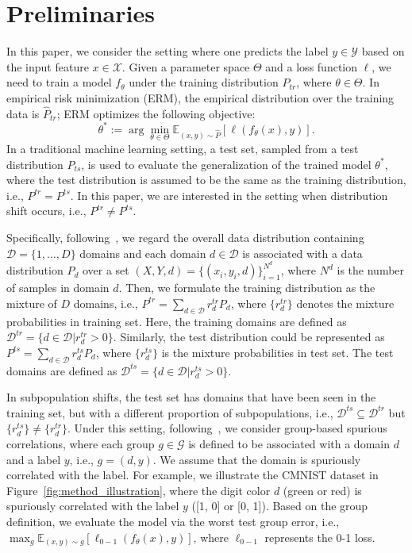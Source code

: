 \section{Preliminaries}
\label{sec:prelim}
In this paper, we consider the setting where one predicts the label $y \in \mathcal{Y}$ based on the input feature $x\in \mathcal{X}$. Given a parameter space $\Theta$ and a loss function $\ell$, we need to train a model $f_{\theta}$ under the training distribution $P_{tr}$, where $\theta \in \Theta$. In empirical risk minimization (ERM), the empirical distribution over the training data is $\hat{P}_{tr}$; ERM optimizes the following objective:
\begin{equation}
\label{eq:erm}
\theta^{*} := \arg\min_{\theta \in \Theta} \mathbb{E}_{(x,y)\sim \hat{P}} [\ell(f_{\theta}(x), y)].
\end{equation}
In a traditional machine learning setting, a test set, sampled from a test distribution $P_{ts}$, is used to evaluate the generalization of the trained model $\theta^{*}$, where the test distribution is assumed to be the same as the training distribution, i.e., $P^{tr}=P^{ts}$. In this paper, we are interested in the setting when distribution shift occurs, i.e., $P^{tr}\neq P^{ts}$. 


Specifically, following~\citet{muandet2013domain,albuquerque2019generalizing,koh2021wilds}, we regard the overall data distribution containing $\mathcal{D}=\{1,\ldots,D\}$ domains and each domain $d\in \mathcal{D}$ is associated with a data distribution $P_d$ over a set $(X, Y, d)=\{(x_i, y_i, d)\}_{i=1}^{N^d}$, where $N^d$ is the number of samples in domain $d$. Then, we formulate the training distribution as the mixture of $D$ domains, i.e., $P^{tr}=\sum_{d\in \mathcal{D}}r_d^{tr} P_d$, where $\{r_d^{tr}\}$ denotes the mixture probabilities in training set. Here, the training domains are defined as $\mathcal{D}^{tr}=\{d\in \mathcal{D} | r_d^{tr}>0\}$. Similarly, the test distribution could be represented as $P^{ts}=\sum_{d\in \mathcal{D}}r_d^{ts} P_d$, where $\{r_d^{ts}\}$ is the mixture probabilities in test set. The test domains are defined as $\mathcal{D}^{ts}=\{d\in \mathcal{D} | r_d^{ts}>0\}$.

In subpopulation shifts, the test set has domains that have been seen in the training set, but with a different proportion of subpopulations, i.e., $\mathcal{D}^{ts} \subseteq \mathcal{D}^{tr}$ but $\{r^{ts}_d\}\neq \{r^{tr}_d\}$. Under this setting, following~\citet{sagawa2019distributionally}, we consider group-based spurious correlations, where each group $g \in \mathcal{G}$ is defined to be associated with a domain $d$ and a label $y$, i.e., $g=(d,y)$. We assume that the domain is spuriously correlated with the label. For example, we illustrate the CMNIST dataset in Figure~\ref{fig:method_illustration}, where the digit color $d$ (green or red) is spuriously correlated with the label $y$ ([1, 0] or [0, 1]). 
Based on the group definition, we evaluate the model via the worst test group error, i.e., $\max_{g}\mathbb{E}_{(x,y)\sim g}[\ell_{0-1}(f_{\theta}(x),y)]$, where $\ell_{0-1}$ represents the 0-1 loss.

